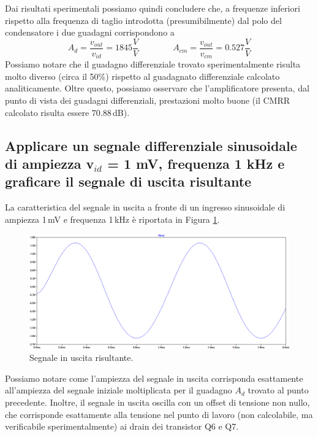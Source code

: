 \documentclass[a4paper,10pt]{article}
\begin{document}
Dai risultati sperimentali possiamo quindi concludere che, a frequenze inferiori rispetto alla frequenza di taglio introdotta (presumibilmente) dal polo del condensatore i due guadagni corrispondono a
\begin{equation*}
A_d = \frac{v_{out}}{v_{id}} = 1845 \frac{V}{V} \qquad \qquad A_{cm} = \frac{v_{out}}{v_{cm}} = 0.527 \frac{V}{V}
\end{equation*}
Possiamo notare che il guadagno differenziale trovato sperimentalmente risulta molto diverso (circa il 50\%) rispetto al guadagnato differenziale calcolato analiticamente. Oltre questo, possiamo osservare che l'amplificatore presenta, dal punto di vista dei guadagni differenziali, prestazioni molto buone (il CMRR calcolato risulta essere 70.88$\,$dB).


\subsection{Applicare un segnale differenziale sinusoidale di ampiezza v$_{id}$ = 1 mV, frequenza 1 kHz e graficare il segnale di uscita risultante}
La caratteristica del segnale in uscita a fronte di un ingresso sinusoidale di ampiezza 1$\,$mV e frequenza 1$\,$kHz è riportata in Figura \ref{fig:outsig}. \\
\begin{figure}[h!]
  	\centering
 	\includegraphics[width=1\linewidth]{es1-8.png}
  	\caption{Segnale in uscita risultante.}
  	\label{fig:outsig}
\end{figure}

Possiamo notare come l'ampiezza del segnale in uscita corrisponda esattamente all'ampiezza del segnale iniziale moltiplicata per il guadagno $A_d$ trovato al punto precedente. Inoltre, il segnale in uscita oscilla con un offset di tensione non nullo, che corrisponde esattamente alla tensione nel punto di lavoro (non calcolabile, ma verificabile sperimentalmente) ai drain dei transistor Q6 e Q7.
\end{document}

